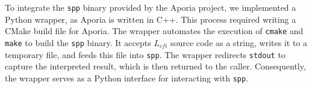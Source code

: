 To integrate the \texttt{spp} binary provided by the Aporia project, we implemented a Python wrapper, as Aporia is written in C++. This process required writing a CMake build file for Aporia. The wrapper automates the execution of \texttt{cmake} and \texttt{make} to build the \texttt{spp} binary. It accepts $L_{cfi}$ source code as a string, writes it to a temporary file, and feeds this file into \texttt{spp}. The wrapper redirects \texttt{stdout} to capture the interpreted result, which is then returned to the caller. Consequently, the wrapper serves as a Python interface for interacting with \texttt{spp}.

